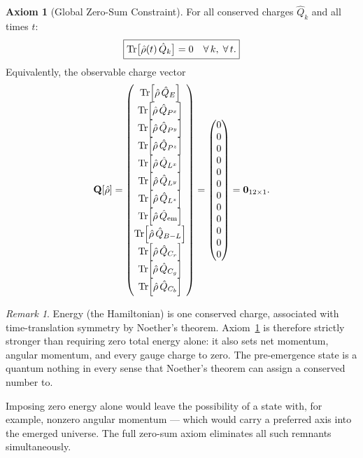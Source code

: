\documentclass[12pt,a4paper]{article}
\theoremstyle{definition}
\newtheorem{axiom}{Axiom}
\theoremstyle{remark}
\newtheorem{remark}[theorem]{Remark}
\newcommand{\rhohat}{\hat{\rho}}
\newcommand{\Qhat}{\hat{Q}}
\begin{document}
\begin{axiom}[Global Zero-Sum Constraint]\label{ax:zs}
For all conserved charges $\Qhat_k$ and all times $t$:
\begin{equation}\label{eq:ZSC}
  \boxed{\Tr\bigl[\rhohat(t)\,\Qhat_k\bigr] = 0
  \quad \forall\, k,\; \forall\, t.}
\end{equation}
Equivalently, the observable charge vector
\begin{equation}\label{eq:charge_vector}
  \mathbf{Q}[\rhohat]
  = \begin{pmatrix}
    \Tr[\rhohat\,\Qhat_E] \\
    \Tr[\rhohat\,\Qhat_{P^{x}}] \\
    \Tr[\rhohat\,\Qhat_{P^{y}}] \\
    \Tr[\rhohat\,\Qhat_{P^{z}}] \\
    \Tr[\rhohat\,\Qhat_{L^{x}}] \\
    \Tr[\rhohat\,\Qhat_{L^{y}}] \\
    \Tr[\rhohat\,\Qhat_{L^{z}}] \\
    \Tr[\rhohat\,\Qhat_{\mathrm{em}}] \\
    \Tr[\rhohat\,\Qhat_{B-L}] \\
    \Tr[\rhohat\,\Qhat_{C_r}] \\
    \Tr[\rhohat\,\Qhat_{C_g}] \\
    \Tr[\rhohat\,\Qhat_{C_b}]
  \end{pmatrix}
  =
  \begin{pmatrix} 0 \\ 0 \\ 0 \\ 0 \\ 0 \\ 0 \\ 0 \\ 0 \\ 0 \\ 0 \\ 0 \\ 0 \end{pmatrix}
  = \mathbf{0}_{12\times 1}.
\end{equation}
\end{axiom}

\begin{remark}
Energy (the Hamiltonian) is one conserved charge, associated with
time-translation symmetry by Noether's theorem.
Axiom~\ref{ax:zs} is therefore strictly stronger than requiring zero total
energy alone: it also sets net momentum, angular momentum, and every gauge
charge to zero.
The pre-emergence state is a quantum nothing in every sense that Noether's
theorem can assign a conserved number to.

Imposing zero energy alone would leave the possibility of a state with, for
example, nonzero angular momentum --- which would carry a preferred axis
into the emerged universe.
The full zero-sum axiom eliminates all such remnants simultaneously.
\end{remark}
\end{document}
